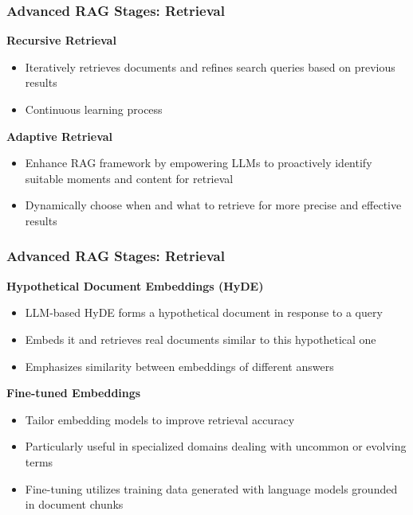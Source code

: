 \begin{frame}[fragile]\frametitle{Advanced RAG Stages: Retrieval}
\textbf{Recursive Retrieval}
  \begin{itemize}
    \item Iteratively retrieves documents and refines search queries based on previous results
    \item Continuous learning process
  \end{itemize}
\textbf{Adaptive Retrieval}
  \begin{itemize}
    \item Enhance RAG framework by empowering LLMs to proactively identify suitable moments and content for retrieval
    \item Dynamically choose when and what to retrieve for more precise and effective results
  \end{itemize}
\end{frame}

\begin{frame}[fragile]\frametitle{Advanced RAG Stages: Retrieval}
\textbf{Hypothetical Document Embeddings (HyDE)}
  \begin{itemize}
    \item LLM-based HyDE forms a hypothetical document in response to a query
    \item Embeds it and retrieves real documents similar to this hypothetical one
    \item Emphasizes similarity between embeddings of different answers
  \end{itemize}
\textbf{Fine-tuned Embeddings}
  \begin{itemize}
    \item Tailor embedding models to improve retrieval accuracy
    \item Particularly useful in specialized domains dealing with uncommon or evolving terms
    \item Fine-tuning utilizes training data generated with language models grounded in document chunks
  \end{itemize}
\end{frame}


